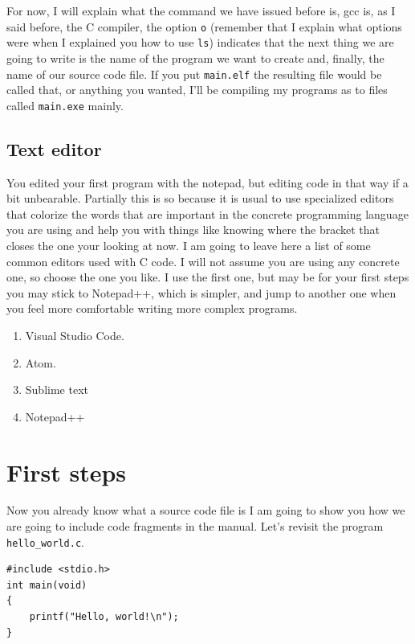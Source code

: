 \documentclass[a4paper]{article}
\begin{document}
For now, I will explain what the command we have issued before is, gcc is, as
I said before, the C compiler, the option \verb!o! (remember that I explain
what options were when I explained you how to use \verb!ls!) indicates that the
next thing we are going to write is the name of the program we want to create
and, finally, the name of our source code file. If you put \verb!main.elf! the
resulting file would be called that, or anything you wanted, I'll be compiling
my programs as to files called \verb!main.exe! mainly.

\subsection{Text editor}
You edited your first program with the notepad, but editing code in that way
if a bit unbearable. Partially this is so because it is usual to use specialized
editors that colorize the words that are important in the concrete programming
language you are using and help you with things like knowing where the bracket
that closes the one your looking at now. I am going to leave here a list of
some common editors used with C code. I will not assume you are using any
concrete one, so choose the one you like. I use the first one, but may be for
your first steps you may stick to Notepad++, which is simpler, and jump
to another one when you feel more comfortable writing more complex programs.
\begin{enumerate}
    \item Visual Studio Code.
    \item Atom.
    \item Sublime text
    \item Notepad++
\end{enumerate}

\section{First steps}

Now you already know what a source code file is I am going to show you how we
are going to include code fragments in the manual. Let's revisit the program
\verb!hello_world.c!.

\noindent
\begin{minipage}[H]{\linewidth}
\mbox{}
\begin{lstlisting}[style=C, caption={Hello World in C},
label={lst:helloWorld}]
#include <stdio.h>
int main(void)
{
    printf("Hello, world!\n");
}
\end{lstlisting}
\end{minipage}
\end{document}
